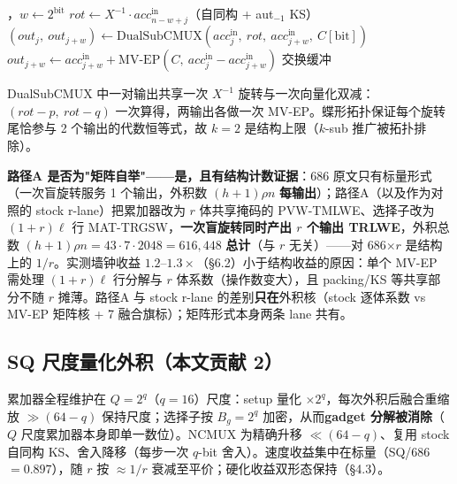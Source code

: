 \documentclass[11pt]{article}
\begin{document}
\begin{algorithm}[htbp]
\caption{MonomialMul：累加器数组的蝶形旋转（每精度位）}
\label{alg:bfly}
\begin{algorithmic}[1]
\For{$\text{bit}\in[0,\rho)$}，$w\leftarrow 2^{\text{bit}}$
  \For{$j\in[0,w)$} 
     \State $rot \leftarrow X^{-1}\!\cdot acc^{\mathrm{in}}_{n-w+j}$（自同构 + aut$_{-1}$ KS）
     \State $(out_j,\ out_{j+w}) \leftarrow \mathrm{DualSubCMUX}(acc^{\mathrm{in}}_j,\ rot,\ acc^{\mathrm{in}}_{j+w},\ C[\text{bit}])$
  \EndFor
  \For{$j\in[w,\,n{-}w)$} 
     \State $out_{j+w} \leftarrow acc^{\mathrm{in}}_{j+w} + \mathrm{MV\text{-}EP}(C,\ acc^{\mathrm{in}}_j - acc^{\mathrm{in}}_{j+w})$
  \EndFor
\EndFor
\State 交换缓冲
\end{algorithmic}
\end{algorithm}

DualSubCMUX 中一对输出共享一次 $X^{-1}$ 旋转与一次向量化双减：$(rot{-}p,\ rot{-}q)$ 一次算得，两输出各做一次 MV-EP。蝶形拓扑保证每个旋转尾恰参与 2 个输出的代数恒等式，故 $k{=}2$ 是结构上限（$k$-sub 推广被拓扑排除）。

\textbf{路径A 是否为"矩阵自举"——是，且有结构计数证据}：686 原文只有标量形式（一次盲旋转服务 1 个输出，外积数 $(h{+}1)\rho n$ \textbf{每输出}）；路径A（以及作为对照的 stock r-lane）把累加器改为 $r$ 体共享掩码的 PVW-TMLWE、选择子改为 $(1{+}r)\ell$ 行 MAT-TRGSW，\textbf{一次盲旋转同时产出 $r$ 个输出 TRLWE}，外积总数 $(h{+}1)\rho n=43\cdot7\cdot2048=616{,}448$ \textbf{总计}（与 $r$ 无关）——对 686$\times r$ 是结构上的 $1/r$。实测墙钟收益 $1.2$--$1.3\times$（\S6.2）小于结构收益的原因：单个 MV-EP 需处理 $(1{+}r)\ell$ 行分解与 $r$ 体系数（操作数变大），且 packing/KS 等共享部分不随 $r$ 摊薄。路径A 与 stock r-lane 的差别\textbf{只在}外积核（stock 逐体系数 vs MV-EP 矩阵核 + 7 融合旗标）；矩阵形式本身两条 lane 共有。

\subsection{SQ 尺度量化外积（本文贡献 2）}

累加器全程维护在 $Q=2^{q}$（$q{=}16$）尺度：setup 量化 $\times 2^q$，每次外积后融合重缩放 $\gg (64{-}q)$ 保持尺度；选择子按 $B_g{=}2^{q}$ 加密，从而\textbf{gadget 分解被消除}（$Q$ 尺度累加器本身即单一数位）。NCMUX 为精确升移 $\ll(64{-}q)$、复用 stock 自同构 KS、舍入降移（每步一次 $q$-bit 舍入）。速度收益集中在标量（SQ/686 $=0.897$），随 $r$ 按 $\approx 1/r$ 衰减至平价；硬化收益双形态保持（\S4.3）。
\end{document}
